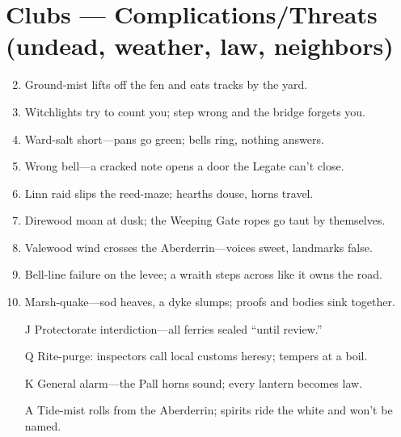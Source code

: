 \section*{Clubs --- Complications/Threats (undead, weather, law, neighbors)}
\label{sec:mistlands-complications}
\begin{enumerate}
\setcounter{enumi}{1}
\item Ground-mist lifts off the fen and eats tracks by the yard.
\item Witchlights try to count you; step wrong and the bridge forgets you.
\item Ward-salt short---pans go green; bells ring, nothing answers.
\item Wrong bell---a cracked note opens a door the Legate can't close.
\item Linn raid slips the reed-maze; hearths douse, horns travel.
\item Direwood moan at dusk; the Weeping Gate ropes go taut by themselves.
\item Valewood wind crosses the Aberderrin---voices sweet, landmarks false.
\item Bell-line failure on the levee; a wraith steps across like it owns the road.
\item Marsh-quake---sod heaves, a dyke slumps; proofs and bodies sink together.
\item[J] Protectorate interdiction---all ferries sealed ``until review.''
\item[Q] Rite-purge: inspectors call local customs heresy; tempers at a boil.
\item[K] General alarm---the Pall horns sound; every lantern becomes law.
\item[A] Tide-mist rolls from the Aberderrin; spirits ride the white and won't be named.
\end{enumerate}

